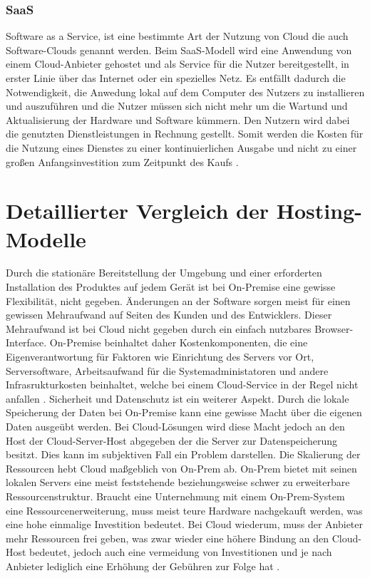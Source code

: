 \documentclass[12pt,bibtotoc]{article}
\begin{document}
		\newpage
		\subsubsection{SaaS}
		Software as a Service, ist eine bestimmte Art der Nutzung von Cloud die auch Software-Clouds genannt werden. 
		Beim SaaS-Modell wird eine Anwendung von einem Cloud-Anbieter gehostet und als Service für die Nutzer bereitgestellt, in erster Linie über das Internet oder ein spezielles Netz.
		Es entfällt dadurch die Notwendigkeit, die Anwedung lokal auf dem Computer des Nutzers zu installieren und auszuführen und die Nutzer müssen sich nicht mehr um die Wartund und Aktualisierung der Hardware und Software kümmern.
		Den Nutzern wird dabei die genutzten Dienstleistungen in Rechnung gestellt. Somit werden die Kosten für die Nutzung eines Dienstes zu einer kontinuierlichen Ausgabe und nicht zu einer großen Anfangsinvestition zum Zeitpunkt des Kaufs \cite{Murugesan.2016}.
		
	\section{Detaillierter Vergleich der Hosting-Modelle}
			Durch die stationäre Bereitstellung der Umgebung und einer erforderten Installation des Produktes auf jedem Gerät ist bei On-Premise eine gewisse Flexibilität, nicht gegeben.
			Änderungen an der Software sorgen meist für einen gewissen Mehraufwand auf Seiten des Kunden und des Entwicklers. Dieser Mehraufwand ist bei Cloud nicht gegeben durch ein einfach nutzbares Browser-Interface. 
			On-Premise beinhaltet daher Kostenkomponenten, die eine Eigenverantwortung für Faktoren wie Einrichtung des Servers vor Ort, Serversoftware, Arbeitsaufwand für die Systemadministatoren und andere Infrasrukturkosten beinhaltet, welche bei einem Cloud-Service in der Regel nicht anfallen \cite{Fisher.2018}.
			\newline
			Sicherheit und Datenschutz ist ein weiterer Aspekt. Durch die lokale Speicherung der Daten bei On-Premise kann eine gewisse Macht über die eigenen Daten ausgeübt werden. 
			Bei Cloud-Lösungen wird diese Macht jedoch an den Host der Cloud-Server-Host abgegeben der die Server zur Datenspeicherung besitzt. Dies kann im subjektiven Fall ein Problem darstellen. 
			\newline
			Die Skalierung der Ressourcen hebt Cloud maßgeblich von On-Prem ab. On-Prem bietet mit seinen lokalen Servers eine meist feststehende beziehungsweise schwer zu erweiterbare Ressourcenstruktur. Braucht eine Unternehmung mit einem On-Prem-System eine 
			Ressourcenerweiterung, muss meist teure Hardware nachgekauft werden, was eine hohe einmalige Investition bedeutet.
			Bei Cloud wiederum, muss der Anbieter mehr Ressourcen frei geben, was zwar wieder eine höhere Bindung an den Cloud-Host bedeutet, jedoch auch eine vermeidung von Investitionen und je nach Anbieter lediglich eine Erhöhung der Gebühren zur Folge hat \cite{Murugesan.2016}.
			
\end{document}
